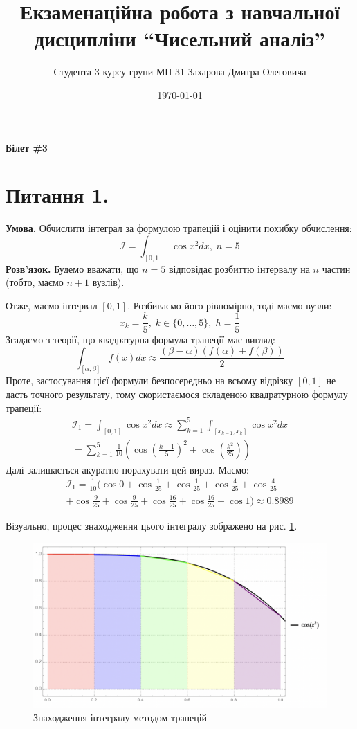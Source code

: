 \documentclass[14pt]{extarticle}
\title{Екзаменаційна робота з навчальної дисципліни ``Чисельний аналіз''}
\author{Студента 3 курсу групи МП-31 Захарова Дмитра Олеговича}
\date{\today}
\begin{document}
\maketitle

\begin{center}
    \textbf{Білет \#3}
\end{center}
\section*{Питання 1.}

\textbf{Умова.} Обчислити інтеграл за формулою трапецій і оцінити похибку обчислення:
\[
\mathcal{I} = \int_{[0,1]} \cos x^2 dx, \; n = 5
\]
\textbf{Розв'язок.} Будемо вважати, що $n=5$ відповідає розбиттю інтервалу на $n$ частин (тобто, маємо $n+1$ вузлів). 

Отже, маємо інтервал $[0,1]$. Розбиваємо його рівномірно, тоді маємо вузли:
\[
x_k = \frac{k}{5}, \; k \in \{0,\dots,5\}, \; h = \frac{1}{5}
\]
Згадаємо з теорії, що квадратурна формула трапеції має вигляд:
\[
\int_{[\alpha,\beta]} f(x)dx \approx \frac{(\beta-\alpha)(f(\alpha)+f(\beta))}{2}
\]
Проте, застосування цієї формули безпосередньо на всьому відрізку $[0,1]$ не дасть точного результату, тому скористаємося складеною квадратурною формулу трапеції:
\begin{gather*}
\mathcal{I}_1 = \int_{[0,1]}\cos x^2 dx \approx \sum_{k=1}^5 \int_{[x_{k-1},x_k]}\cos x^2 dx \\
= \sum_{k=1}^5 \frac{1}{10}\left(\cos \left(\frac{k-1}{5}\right)^2 + \cos\left(\frac{k^2}{25}\right)\right)
\end{gather*}
Далі залишається акуратно порахувати цей вираз. Маємо:
\begin{gather*}
\mathcal{I}_1 = \frac{1}{10}\Big(\cos 0 + \cos \frac{1}{25} + \cos \frac{1}{25} + \cos \frac{4}{25} + \cos \frac{4}{25} \\ + \cos \frac{9}{25}+\cos \frac{9}{25} + \cos \frac{16}{25}+\cos \frac{16}{25} + \cos 1\Big) \approx 0.8989
\end{gather*}

Візуально, процес знаходження цього інтегралу зображено на рис. \ref{fig:1}. 

\begin{figure}[H]
    \centering
    \includegraphics[width=\textwidth]{images/exam/plot.png}
    \caption{Знаходження інтегралу методом трапецій}
    \label{fig:1}
\end{figure}
\end{document}
